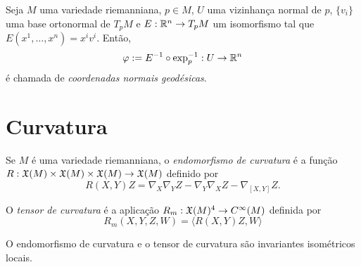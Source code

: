 \begin{definicao}
	Seja
	$M$ uma variedade riemanniana,
	$p \in M$,
	$U$ uma vizinhança normal de $p$,
	$\{v_i\}$ uma base ortonormal de $T_p M$ e
	$E: \mathbb R^n \rightarrow T_p M$ um isomorfismo tal que $E(x^1,\ldots,x^n) = x^i v^i$.
	Então,
	\begin{equation*}
		\varphi := E^{-1} \circ \exp_p^{-1}: U \rightarrow \mathbb R^n
	\end{equation*}
	é chamada de \emph{coordenadas normais geodésicas}.
\end{definicao}

\section{Curvatura}

\begin{definicao}
	Se $M$ é uma variedade riemanniana, o \emph{endomorfismo de curvatura} é a função $R: \mathfrak{X}(M) \times \mathfrak{X}(M) \times \mathfrak{X}(M) \rightarrow \mathfrak{X}(M) $ definido por
	\begin{equation*}
		R(X,Y)Z = \nabla_X \nabla_Y Z - \nabla_Y \nabla_X Z - \nabla_{[X,Y]}Z.
	\end{equation*}
\end{definicao}


\begin{definicao}
	O \emph{tensor de curvatura} é a aplicação $R_m: \mathfrak{X}(M)^4 \rightarrow C^\infty(M)$ definida por
	\begin{equation*}
		R_m (X,Y,Z,W) = \langle R(X,Y)Z,W \rangle
	\end{equation*}
\end{definicao}

\begin{teorema}
	O endomorfismo de curvatura e o tensor de curvatura são invariantes isométricos locais.
\end{teorema}

